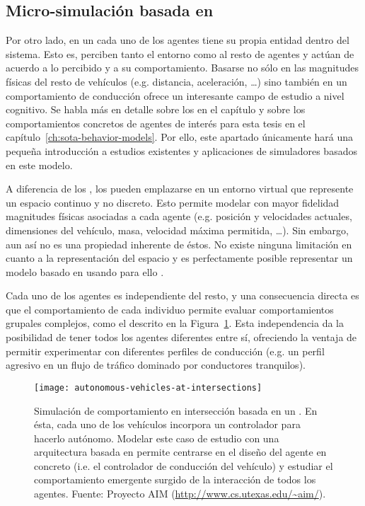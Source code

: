 \subsection{Micro-simulación basada en }

Por otro lado, en un  cada uno de los agentes tiene su propia entidad dentro del sistema. Esto es, perciben tanto el entorno como al resto de agentes y actúan de acuerdo a lo percibido y a su comportamiento. Basarse no sólo en las magnitudes físicas del resto de vehículos (e.g. distancia, aceleración, \ldots) sino también en un comportamiento de conducción ofrece un interesante campo de estudio a nivel cognitivo. Se habla más en detalle sobre los  en el capítulo  y sobre los comportamientos concretos de agentes de interés para esta tesis en el capítulo~\ref{ch:sota-behavior-models}. Por ello, este apartado únicamente hará una pequeña introducción a estudios existentes y aplicaciones de simuladores basados en este modelo.

A diferencia de los , los  pueden emplazarse en un entorno virtual que represente un espacio continuo y no discreto. Esto permite modelar con mayor fidelidad magnitudes físicas asociadas a cada agente (e.g. posición y velocidades actuales, dimensiones del vehículo, masa, velocidad máxima permitida, \ldots). Sin embargo, aun así no es una propiedad inherente de éstos. No existe ninguna limitación en cuanto a la representación del espacio y es perfectamente posible representar un modelo basado en  usando para ello .

Cada uno de los agentes es independiente del resto, y una consecuencia directa es que el comportamiento de cada individuo permite evaluar comportamientos grupales complejos, como el descrito en la Figura~\ref{fig:autonomous-vehicles-at-intersections}. Esta independencia da la posibilidad de tener todos los agentes diferentes entre sí, ofreciendo la ventaja de permitir experimentar con diferentes perfiles de conducción (e.g. un perfil agresivo en un flujo de tráfico dominado por conductores tranquilos).

\begin{figure}
	\centering
	\texttt{[image: autonomous-vehicles-at-intersections]}
	\caption[Simulación de comportamiento en intersección basada en un ]{Simulación de comportamiento en intersección basada en un . En ésta, cada uno de los vehículos incorpora un controlador para hacerlo autónomo. Modelar este caso de estudio con una arquitectura basada en  permite centrarse en el diseño del agente en concreto (i.e. el controlador de conducción del vehículo) y estudiar el comportamiento emergente surgido de la interacción de todos los agentes. Fuente: Proyecto AIM (\url{http://www.cs.utexas.edu/~aim/}).}
	\label{fig:autonomous-vehicles-at-intersections}
\end{figure}

